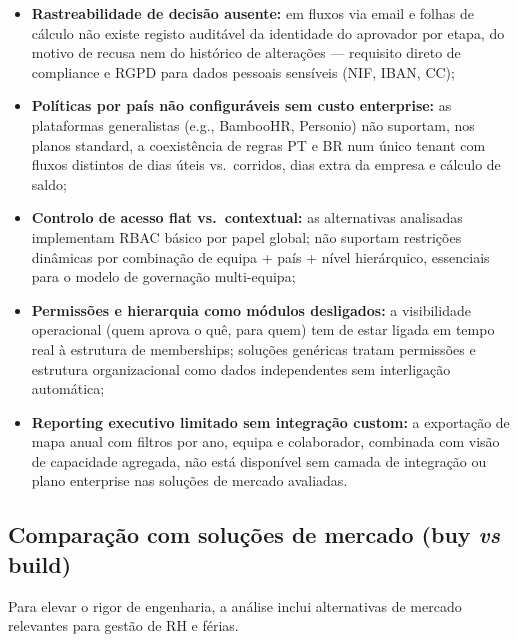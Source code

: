 \documentclass[11pt,a4paper,twoside]{article}
\begin{document}
\begin{itemize}
  \item \textbf{Rastreabilidade de decisão ausente:} em fluxos via email e folhas de cálculo não existe registo auditável da identidade do aprovador por etapa, do motivo de recusa nem do histórico de alterações --- requisito direto de compliance e RGPD para dados pessoais sensíveis (NIF, IBAN, CC);
  \item \textbf{Políticas por país não configuráveis sem custo enterprise:} as plataformas generalistas (e.g., BambooHR, Personio) não suportam, nos planos standard, a coexistência de regras PT e BR num único tenant com fluxos distintos de dias úteis vs.\ corridos, dias extra da empresa e cálculo de saldo;
  \item \textbf{Controlo de acesso flat vs.\ contextual:} as alternativas analisadas implementam RBAC básico por papel global; não suportam restrições dinâmicas por combinação de equipa + país + nível hierárquico, essenciais para o modelo de governação multi-equipa;
  \item \textbf{Permissões e hierarquia como módulos desligados:} a visibilidade operacional (quem aprova o quê, para quem) tem de estar ligada em tempo real à estrutura de memberships; soluções genéricas tratam permissões e estrutura organizacional como dados independentes sem interligação automática;
  \item \textbf{Reporting executivo limitado sem integração custom:} a exportação de mapa anual com filtros por ano, equipa e colaborador, combinada com visão de capacidade agregada, não está disponível sem camada de integração ou plano enterprise nas soluções de mercado avaliadas.
\end{itemize}

\subsection{Comparação com soluções de mercado (buy \textit{vs} build)}

Para elevar o rigor de engenharia, a análise inclui alternativas de mercado relevantes para gestão de RH e férias.
\end{document}
